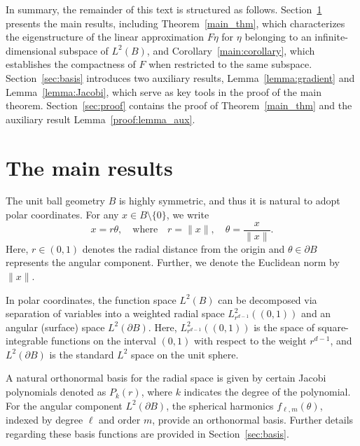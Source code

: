 \documentclass[reqno]{amsart}
\numberwithin{equation}{section}
\numberwithin{figure}{section}
\numberwithin{table}{section}
\theoremstyle{plain}
\theoremstyle{definition}
\theoremstyle{remark}
\newcommand{\norm}[1]{\lVert#1\rVert}
\newcommand{\sphe}{{\partial B}}
\begin{document}
In summary, the remainder of this text is structured as follows.
%
Section~\ref{sec:main_results} presents the main results, including Theorem~\ref{main_thm}, which characterizes the eigenstructure of the linear approximation \( F \eta \) for \( \eta \) belonging to an infinite-dimensional subspace of \( L^2(B) \), and Corollary~\ref{main:corollary}, which establishes the compactness of \( F \) when restricted to the same subspace.
%
Section~\ref{sec:basis} introduces two auxiliary results, Lemma~\ref{lemma:gradient} and Lemma~\ref{lemma:Jacobi}, which serve as key tools in the proof of the main theorem.
%
Section~\ref{sec:proof} contains the proof of Theorem~\ref{main_thm} and the auxiliary result Lemma~\ref{proof:lemma_aux}.
%


\section{The main results} \label{sec:main_results}


The unit ball geometry \( B \) is highly symmetric, and thus it is natural to adopt polar coordinates.
%
For any \( x \in B \setminus \{ 0 \} \), we write
%
\begin{equation} \label{eq:polar_coordinates}
    x = r \theta, \quad \text{where} \quad r = \norm{x}, \quad \theta = \frac{x}{\norm{x}}.
\end{equation}
%
Here, \( r \in (0, 1) \) denotes the radial distance from the origin and \( \theta \in \sphe \) represents the angular component.
%
Further, we denote the Euclidean norm by \( \norm{x} \).
%


In polar coordinates, the function space \( L^2(B) \) can be decomposed via separation of variables into a weighted radial space \( L^2_{r^{d-1}}((0,1)) \) and an angular (surface) space \( L^2(\sphe) \).
%
Here, \( L^2_{r^{d-1}}((0,1)) \) is the space of square-integrable functions on the interval \( (0, 1) \) with respect to the weight \( r^{d-1} \), and \( L^2(\sphe) \) is the standard \( L^2 \) space on the unit sphere.
%


A natural orthonormal basis for the radial space is given by certain Jacobi polynomials denoted as \( P_k(r) \), where \( k \) indicates the degree of the polynomial.
%
For the angular component \( L^2(\sphe) \), the spherical harmonics \( f_{\ell, m}(\theta) \), indexed by degree \( \ell \) and order \( m \), provide an orthonormal basis.
%
Further details regarding these basis functions are provided in Section~\ref{sec:basis}.
%
\end{document}
